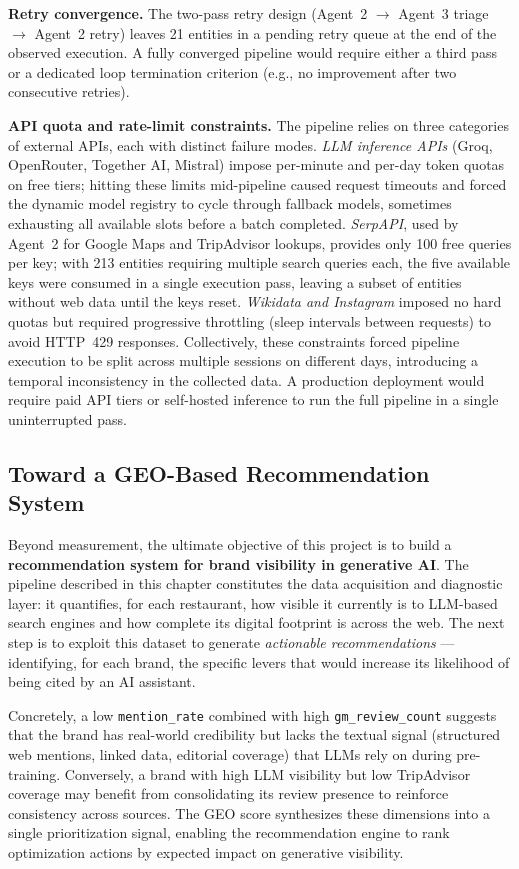 \textbf{Retry convergence.} The two-pass retry design (Agent~2 $\rightarrow$
Agent~3 triage $\rightarrow$ Agent~2 retry) leaves 21 entities in a pending retry
queue at the end of the observed execution. A fully converged pipeline would
require either a third pass or a dedicated loop termination criterion (e.g., no
improvement after two consecutive retries).

\textbf{API quota and rate-limit constraints.}
The pipeline relies on three categories of external APIs, each with distinct
failure modes. \textit{LLM inference APIs} (Groq, OpenRouter, Together AI, Mistral)
impose per-minute and per-day token quotas on free tiers; hitting these limits
mid-pipeline caused request timeouts and forced the dynamic model registry to
cycle through fallback models, sometimes exhausting all available slots before a
batch completed. \textit{SerpAPI}, used by Agent~2 for Google Maps and TripAdvisor
lookups, provides only 100 free queries per key; with 213 entities requiring
multiple search queries each, the five available keys were consumed in a single
execution pass, leaving a subset of entities without web data until the keys
reset. \textit{Wikidata and Instagram} imposed no hard quotas but required
progressive throttling (sleep intervals between requests) to avoid HTTP~429
responses. Collectively, these constraints forced pipeline execution to be split
across multiple sessions on different days, introducing a temporal inconsistency in
the collected data. A production deployment would require paid API tiers or
self-hosted inference to run the full pipeline in a single uninterrupted pass.

\subsection*{Toward a GEO-Based Recommendation System}

Beyond measurement, the ultimate objective of this project is to build a
\textbf{recommendation system for brand visibility in generative AI}.
The pipeline described in this chapter constitutes the data acquisition and
diagnostic layer: it quantifies, for each restaurant, how visible it currently is
to LLM-based search engines and how complete its digital footprint is across the
web. The next step is to exploit this dataset to generate \textit{actionable
recommendations} --- identifying, for each brand, the specific levers that would
increase its likelihood of being cited by an AI assistant.

Concretely, a low \texttt{mention\_rate} combined with high \texttt{gm\_review\_count}
suggests that the brand has real-world credibility but lacks the textual signal
(structured web mentions, linked data, editorial coverage) that LLMs rely on
during pre-training. Conversely, a brand with high LLM visibility but low
TripAdvisor coverage may benefit from consolidating its review presence to
reinforce consistency across sources. The GEO score synthesizes these dimensions
into a single prioritization signal, enabling the recommendation engine to rank
optimization actions by expected impact on generative visibility.

